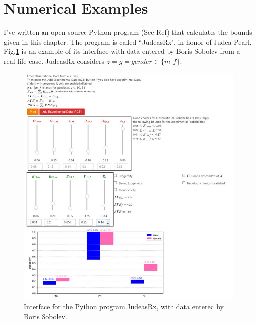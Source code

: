 \section{Numerical Examples}

I've written an open source Python program
(See Ref\cite{judeas-rx})
that calculates the
bounds given in this chapter. 
The program
is called ``JudeasRx", in honor of Judea
Pearl. 
Fig.\ref{fig-sobolev}
is an example of its interface
with data entered by Boris Sobolev
from a real life case.
JudeasRx considers
 $z=g=gender\in \{m,f\}$.

\begin{figure}[h!]
\centering
\includegraphics[width=6in]
{personalized/judeas-rx-boris-sobolev.jpeg}
\caption{Interface
for the Python
program JudeasRx,
with data entered 
by Boris Sobolev.} 
\label{fig-sobolev}
\end{figure}


